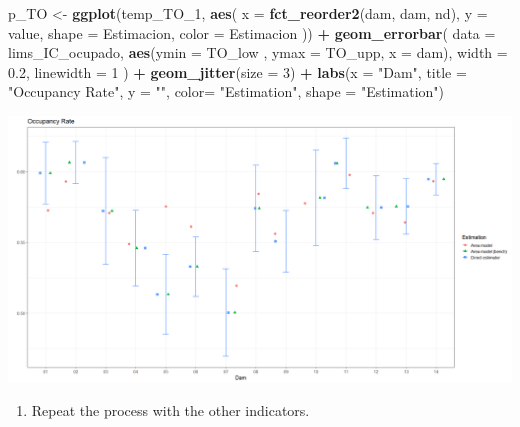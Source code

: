 \documentclass[
  12pt,
]{book}
\newenvironment{Shaded}{\begin{snugshade}}{\end{snugshade}}
\newcommand{\AttributeTok}[1]{\textcolor[rgb]{0.13,0.29,0.53}{#1}}
\newcommand{\DecValTok}[1]{\textcolor[rgb]{0.00,0.00,0.81}{#1}}
\newcommand{\FloatTok}[1]{\textcolor[rgb]{0.00,0.00,0.81}{#1}}
\newcommand{\FunctionTok}[1]{\textcolor[rgb]{0.13,0.29,0.53}{\textbf{#1}}}
\newcommand{\NormalTok}[1]{#1}
\newcommand{\OtherTok}[1]{\textcolor[rgb]{0.56,0.35,0.01}{#1}}
\newcommand{\SpecialCharTok}[1]{\textcolor[rgb]{0.81,0.36,0.00}{\textbf{#1}}}
\newcommand{\StringTok}[1]{\textcolor[rgb]{0.31,0.60,0.02}{#1}}
\providecommand{\tightlist}{%
  \setlength{\itemsep}{0pt}\setlength{\parskip}{0pt}}
\begin{document}
\begin{Shaded}
\begin{Highlighting}[]
\NormalTok{p\_TO }\OtherTok{\textless{}{-}} \FunctionTok{ggplot}\NormalTok{(temp\_TO\_1,}
                    \FunctionTok{aes}\NormalTok{(}
                      \AttributeTok{x =} \FunctionTok{fct\_reorder2}\NormalTok{(dam, dam, nd),}
                      \AttributeTok{y =}\NormalTok{ value,}
                      \AttributeTok{shape =}\NormalTok{ Estimacion,}
                      \AttributeTok{color =}\NormalTok{ Estimacion}
\NormalTok{                    )) }\SpecialCharTok{+}
  \FunctionTok{geom\_errorbar}\NormalTok{(}
    \AttributeTok{data =}\NormalTok{ lims\_IC\_ocupado,}
    \FunctionTok{aes}\NormalTok{(}\AttributeTok{ymin =}\NormalTok{ TO\_low ,}
        \AttributeTok{ymax =}\NormalTok{ TO\_upp, }\AttributeTok{x =}\NormalTok{ dam),}
    \AttributeTok{width =} \FloatTok{0.2}\NormalTok{,}
    \AttributeTok{linewidth =} \DecValTok{1}
\NormalTok{  )  }\SpecialCharTok{+}
  \FunctionTok{geom\_jitter}\NormalTok{(}\AttributeTok{size =} \DecValTok{3}\NormalTok{) }\SpecialCharTok{+}
  \FunctionTok{labs}\NormalTok{(}\AttributeTok{x =} \StringTok{"Dam"}\NormalTok{, }\AttributeTok{title =} \StringTok{"Occupancy Rate"}\NormalTok{, }\AttributeTok{y =} \StringTok{""}\NormalTok{, }
       \AttributeTok{color=} \StringTok{"Estimation"}\NormalTok{, }\AttributeTok{shape =} \StringTok{"Estimation"}\NormalTok{)}
\end{Highlighting}
\end{Shaded}

\includegraphics{Recursos/05_Empleo/16_plot_uni_TO.png}

\begin{enumerate}
\def\labelenumi{\arabic{enumi}.}
\setcounter{enumi}{4}
\tightlist
\item
  Repeat the process with the other indicators.
\end{enumerate}
\end{document}
